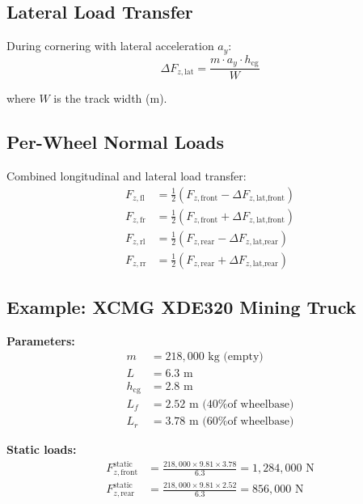 \documentclass[11pt,a4paper]{article}
\begin{document}
\subsection{Lateral Load Transfer}

During cornering with lateral acceleration $a_y$:
\begin{equation}
\Delta F_{z,\text{lat}} = \frac{m \cdot a_y \cdot h_{\text{cg}}}{W}
\end{equation}

where $W$ is the track width (m).

\subsection{Per-Wheel Normal Loads}

Combined longitudinal and lateral load transfer:
\begin{align}
F_{z,\text{fl}} &= \frac{1}{2}\left( F_{z,\text{front}} - \Delta F_{z,\text{lat,front}} \right) \\
F_{z,\text{fr}} &= \frac{1}{2}\left( F_{z,\text{front}} + \Delta F_{z,\text{lat,front}} \right) \\
F_{z,\text{rl}} &= \frac{1}{2}\left( F_{z,\text{rear}} - \Delta F_{z,\text{lat,rear}} \right) \\
F_{z,\text{rr}} &= \frac{1}{2}\left( F_{z,\text{rear}} + \Delta F_{z,\text{lat,rear}} \right)
\end{align}

\subsection{Example: XCMG XDE320 Mining Truck}

\textbf{Parameters:}
\begin{align}
m &= 218{,}000 \text{ kg (empty)} \\
L &= 6.3 \text{ m} \\
h_{\text{cg}} &= 2.8 \text{ m} \\
L_f &= 2.52 \text{ m (40\% of wheelbase)} \\
L_r &= 3.78 \text{ m (60\% of wheelbase)}
\end{align}

\textbf{Static loads:}
\begin{align}
F_{z,\text{front}}^{\text{static}} &= \frac{218{,}000 \times 9.81 \times 3.78}{6.3} = 1{,}284{,}000 \text{ N} \\
F_{z,\text{rear}}^{\text{static}} &= \frac{218{,}000 \times 9.81 \times 2.52}{6.3} = 856{,}000 \text{ N}
\end{align}
\end{document}
